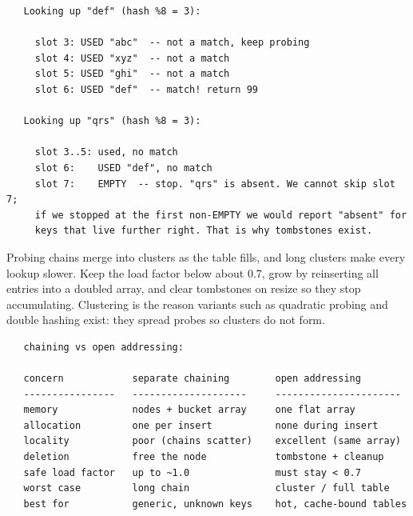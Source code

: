 \begin{verbatim}
   Looking up "def" (hash %8 = 3):

     slot 3: USED "abc"  -- not a match, keep probing
     slot 4: USED "xyz"  -- not a match
     slot 5: USED "ghi"  -- not a match
     slot 6: USED "def"  -- match! return 99

   Looking up "qrs" (hash %8 = 3):

     slot 3..5: used, no match
     slot 6:    USED "def", no match
     slot 7:    EMPTY  -- stop. "qrs" is absent. We cannot skip slot 7;
     if we stopped at the first non-EMPTY we would report "absent" for
     keys that live further right. That is why tombstones exist.
\end{verbatim}

\begin{ruleofthumb}
Probing chains merge into clusters as the table fills, and long
clusters make every lookup slower. Keep the load factor below about
0.7, grow by reinserting all entries into a doubled array, and clear
tombstones on resize so they stop accumulating. Clustering is the
reason variants such as quadratic probing and double hashing exist:
they spread probes so clusters do not form.
\end{ruleofthumb}

\begin{verbatim}
   chaining vs open addressing:

   concern            separate chaining        open addressing
   ----------------   --------------------     ----------------------
   memory             nodes + bucket array     one flat array
   allocation         one per insert           none during insert
   locality           poor (chains scatter)    excellent (same array)
   deletion           free the node            tombstone + cleanup
   safe load factor   up to ~1.0               must stay < 0.7
   worst case         long chain               cluster / full table
   best for           generic, unknown keys    hot, cache-bound tables
\end{verbatim}

